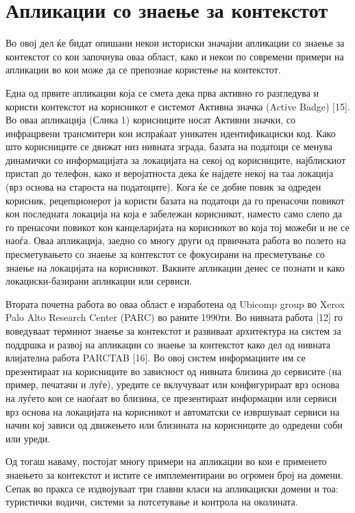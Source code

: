 \section{Апликации со знаење за контекстот}

Во овој дел ќе бидат опишани некои историски значајни апликации со знаење за
контекстот со кои започнува оваа област, како и некои по современи примери на
апликации во кои може да се препознае користење на контекстот.

Една од првите апликации која се смета дека прва активно го разгледува и користи
контекстот на корисникот е системот Активна значка (Active Badge) [15]. Во оваа
апликација (Слика 1) корисниците носат Активни значки, со инфрацрвени
трансмитери кои испраќаат уникатен идентификациски код. Како што корисниците се
движат низ нивната зграда, базата на податоци се менува динамички со
информацијата за локацијата на секој од корисниците, најблискиот пристап до
телефон, како и веројатноста дека ќе најдете некој на таа локација (врз основа
на староста на податоците). Кога ќе се добие повик за одреден корисник,
рецепционерот ја користи базата на податоци да го пренасочи повикот кон
последната локација на која е забележан корисникот, наместо само слепо да го
пренасочи повикот кон канцеларијата на корисникот во која тој можеби и не се
наоѓа. Оваа апликација, заедно со многу други од првичната работа во полето на
пресметувањето со знаење за контекстот се фокусирани на пресметување со знаење
на локацијата на корисникот. Ваквите апликации денес се познати и како
локациски-базирани апликации или сервиси.

Втората почетна работа во оваа област е изработена од Ubicomp group во Xerox
Palo Alto Research Center (PARC) во раните 1990ти. Во нивната работа [12] го
воведуваат терминот знаење за контекстот и развиваат архитектура на систем за
поддршка и развој на апликации со знаење за контекстот како дел од нивната
влијателна работа PARCTAB [16]. Во овој систем информациите им се презентираат
на корисниците во зависност од нивната близина до сервисите (на пример, печатачи
и луѓе), уредите се вклучуваат или конфигурираат врз основа на луѓето кои се
наоѓаат во близина, се презентираат информации или сервиси врз основа на
локацијата на корисникот и автоматски се извршуваат сервиси на начин кој зависи
од движењето или близината на корисниците до одредени соби или уреди.

Од тогаш наваму, постојат многу примери на апликации во кои е применето знаењето
за контекстот и истите се имплементирани во огромен број на домени. Сепак во
пракса се издвојуваат три главни класи на апликациски домени и тоа: туристички
водичи, системи за потсетување и контрола на околината.

